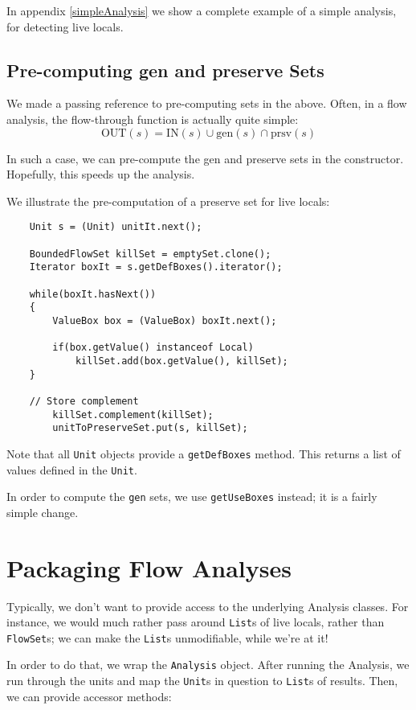 \documentclass{article}
\begin{document}
In appendix \ref{simpleAnalysis} we show a complete example of a simple
analysis, for detecting live locals.

\subsection{Pre-computing gen and preserve Sets}

We made a passing reference to pre-computing sets in the above.
Often, in a flow analysis, the flow-through function is actually quite
simple:
\[\mbox{OUT}(s) = \mbox{IN}(s) \cup \mbox{gen}(s) \cap \mbox{prsv}(s) \]

In such a case, we can pre-compute the gen and preserve sets in the
constructor.  Hopefully, this speeds up the analysis.

We illustrate the pre-computation of a preserve set for live locals:

\begin{verbatim}
    Unit s = (Unit) unitIt.next();

    BoundedFlowSet killSet = emptySet.clone();
    Iterator boxIt = s.getDefBoxes().iterator();

    while(boxIt.hasNext())
    {
        ValueBox box = (ValueBox) boxIt.next();

        if(box.getValue() instanceof Local)
            killSet.add(box.getValue(), killSet);
    }

    // Store complement
        killSet.complement(killSet);
        unitToPreserveSet.put(s, killSet);
\end{verbatim}

Note that all {\tt Unit} objects provide a {\tt getDefBoxes} 
method.  This returns a list of values defined in the {\tt Unit}.

In order to compute the {\tt gen} sets, we use {\tt getUseBoxes} instead;
it is a fairly simple change.

\section{Packaging Flow Analyses}

Typically, we don't want to provide access to the underlying Analysis
classes.  For instance, we would much rather pass around {\tt List}s of
live locals, rather than {\tt FlowSet}s; we can make the {\tt List}s
unmodifiable, while we're at it!

In order to do that, we wrap the {\tt Analysis} object.  After running the
Analysis, we run through the units and map the {\tt Unit}s in question
to {\tt List}s of results.  Then, we can provide accessor methods:
\end{document}
